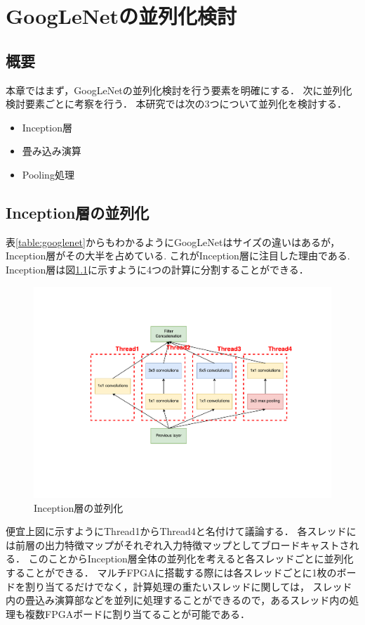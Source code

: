 \chapter{GoogLeNetの並列化検討}
{
\label{chap:parallel}

\section{概要}
本章ではまず，GoogLeNetの並列化検討を行う要素を明確にする．
次に並列化検討要素ごとに考察を行う．
本研究では次の3つについて並列化を検討する．
\begin{itemize}
   \item Inception層 
   \item 畳み込み演算 
   \item Pooling処理 
\end{itemize}
\section{Inception層の並列化}
\label{sec:inception_para}
表\ref{table:googlenet}からもわかるようにGoogLeNetはサイズの違いはあるが，Inception層がその大半を占めている.
これがInception層に注目した理由である.
Inception層は図\ref{fig:para_inception}に示すように4つの計算に分割することができる．
\begin{figure}[h]
  \centering
  \includegraphics[width=12cm]{./chap5/fig/para_inception.pdf}
  \caption{Inception層の並列化}
  \label{fig:para_inception}
\end{figure}
便宜上図に示すようにThread1からThread4と名付けて議論する．
各スレッドには前層の出力特徴マップがそれぞれ入力特徴マップとしてブロードキャストされる．
このことからInception層全体の並列化を考えると各スレッドごとに並列化することができる．
マルチFPGAに搭載する際には各スレッドごとに1枚のボードを割り当てるだけでなく，計算処理の重たいスレッドに関しては，
スレッド内の畳込み演算部などを並列に処理することができるので，あるスレッド内の処理も複数FPGAボードに割り当てることが可能である．

}
